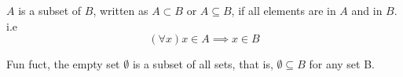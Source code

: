 \begin{definition}
    [Subsets] $A$ is a subset of $B$, written as $A \subset B$ or $A \subseteq B$, if all elements are in $A$ and in $B$. i.e 
    $$(\forall x)x \in A \implies x \in B$$
\end{definition}

\begin{remark}
    Fun fuct, the empty set $\emptyset$ is a subset of all sets, that is, $\emptyset \subseteq B$ for any set B.
\end{remark}